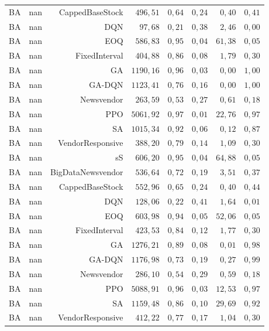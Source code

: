 \begin{table}[htb]
\begin{tabular}{llrrrrrr}
BA & nan & CappedBaseStock & $496{,}51$ & $0{,}64$ & $0{,}24$ & $0{,}40$ & $0{,}41$ \\
BA & nan & DQN & $97{,}68$ & $0{,}21$ & $0{,}38$ & $2{,}46$ & $0{,}00$ \\
BA & nan & EOQ & $586{,}83$ & $0{,}95$ & $0{,}04$ & $61{,}38$ & $0{,}05$ \\
BA & nan & FixedInterval & $404{,}88$ & $0{,}86$ & $0{,}08$ & $1{,}79$ & $0{,}30$ \\
BA & nan & GA & $1190{,}16$ & $0{,}96$ & $0{,}03$ & $0{,}00$ & $1{,}00$ \\
BA & nan & GA-DQN & $1123{,}41$ & $0{,}76$ & $0{,}16$ & $0{,}00$ & $1{,}00$ \\
BA & nan & Newsvendor & $263{,}59$ & $0{,}53$ & $0{,}27$ & $0{,}61$ & $0{,}18$ \\
BA & nan & PPO & $5061{,}92$ & $0{,}97$ & $0{,}01$ & $22{,}76$ & $0{,}97$ \\
BA & nan & SA & $1015{,}34$ & $0{,}92$ & $0{,}06$ & $0{,}12$ & $0{,}87$ \\
BA & nan & VendorResponsive & $388{,}20$ & $0{,}79$ & $0{,}14$ & $1{,}09$ & $0{,}30$ \\
BA & nan & sS & $606{,}20$ & $0{,}95$ & $0{,}04$ & $64{,}88$ & $0{,}05$ \\
BA & nan & BigDataNewsvendor & $536{,}64$ & $0{,}72$ & $0{,}19$ & $3{,}51$ & $0{,}37$ \\
BA & nan & CappedBaseStock & $552{,}96$ & $0{,}65$ & $0{,}24$ & $0{,}40$ & $0{,}44$ \\
BA & nan & DQN & $128{,}06$ & $0{,}22$ & $0{,}41$ & $1{,}64$ & $0{,}01$ \\
BA & nan & EOQ & $603{,}98$ & $0{,}94$ & $0{,}05$ & $52{,}06$ & $0{,}05$ \\
BA & nan & FixedInterval & $423{,}53$ & $0{,}84$ & $0{,}12$ & $1{,}77$ & $0{,}30$ \\
BA & nan & GA & $1276{,}21$ & $0{,}89$ & $0{,}08$ & $0{,}01$ & $0{,}98$ \\
BA & nan & GA-DQN & $1176{,}98$ & $0{,}73$ & $0{,}19$ & $0{,}27$ & $0{,}99$ \\
BA & nan & Newsvendor & $286{,}10$ & $0{,}54$ & $0{,}29$ & $0{,}59$ & $0{,}18$ \\
BA & nan & PPO & $5088{,}91$ & $0{,}96$ & $0{,}03$ & $12{,}53$ & $0{,}97$ \\
BA & nan & SA & $1159{,}48$ & $0{,}86$ & $0{,}10$ & $29{,}69$ & $0{,}92$ \\
BA & nan & VendorResponsive & $412{,}22$ & $0{,}77$ & $0{,}17$ & $1{,}04$ & $0{,}30$ \\

\end{tabular}
\end{table}
